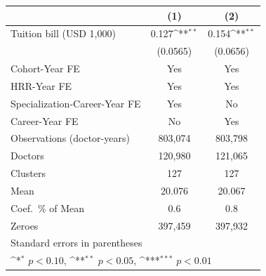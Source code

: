 {
\def\sym#1{\ifmmode^{#1}\else\(^{#1}\)\fi}
\begin{tabular}{l*{2}{c}}
\hline\hline
                    &\multicolumn{1}{c}{(1)}         &\multicolumn{1}{c}{(2)}         \\
\hline
Tuition bill (USD 1,000)&       0.127\sym{**} &       0.154\sym{**} \\
                    &    (0.0565)         &    (0.0656)         \\
[1em]
Cohort-Year FE      &         Yes         &         Yes         \\
[1em]
HRR-Year FE         &         Yes         &         Yes         \\
[1em]
Specialization-Career-Year FE&         Yes         &          No         \\
[1em]
Career-Year FE      &          No         &         Yes         \\
\hline
Observations (doctor-years)&     803,074         &     803,798         \\
Doctors             &     120,980         &     121,065         \\
Clusters            &         127         &         127         \\
Mean                &      20.076         &      20.067         \\
Coef.\ \% of Mean   &         0.6         &         0.8         \\
Zeroes              &     397,459         &     397,932         \\
\hline\hline
\multicolumn{3}{l}{\footnotesize Standard errors in parentheses}\\
\multicolumn{3}{l}{\footnotesize \sym{*} \(p<0.10\), \sym{**} \(p<0.05\), \sym{***} \(p<0.01\)}\\
\end{tabular}
}
